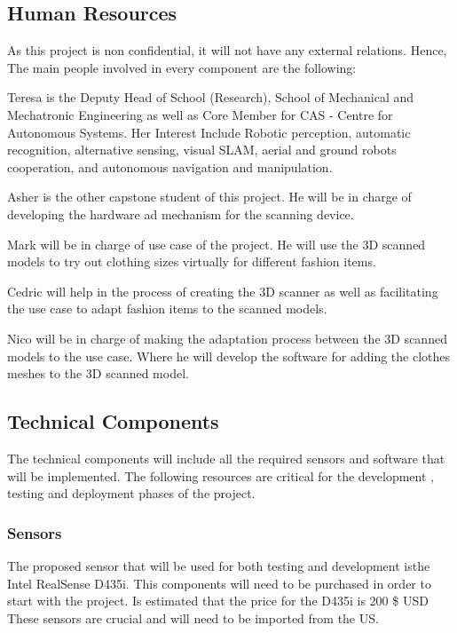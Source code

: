 \documentclass[12pt]{report}
\begin{document}
\subsection{Human Resources}
As this project is non confidential, it will not have any external relations. Hence, The main people involved in every component are the following:
\begin{description}[style=nextline]
  \item[Academic Supervisor – Dr. Teresa Vidal Calleja] Teresa is the Deputy Head of School (Research), School of Mechanical and Mechatronic Engineering as well as Core Member for CAS - Centre for Autonomous Systems. Her Interest Include Robotic perception, automatic recognition, alternative sensing, visual SLAM, aerial and ground robots cooperation, and autonomous navigation and manipulation.
  \item[Hardware Component lead – Asher Katz] Asher is the other capstone student of this project. He will be in charge of developing the hardware ad mechanism for the scanning device.
  \item[Use cases Component Lead – Mark Liu] Mark will be in charge of use case of the project. He will use the 3D scanned models to try out clothing sizes virtually for different fashion items.
  \item[Cedric Le Gentil] Cedric will help in the process of creating the 3D scanner as well as facilitating the use case to adapt fashion items to the scanned models.
  \item[Nico Pietroni] Nico will be in charge of making the adaptation process between the 3D scanned models to the use case. Where he will develop the software for adding the clothes meshes to the 3D scanned model.
\end{description}

\subsection{Technical Components }
The technical components will include all the required sensors and software that will be implemented. The following resources are critical for the development , testing and deployment phases of the project. 

\subsubsection{Sensors}
The proposed sensor that will be used for both testing and development isthe Intel RealSense D435i. This components will need to be purchased in order to start with the project. Is estimated that the price for the D435i is 200 \$ USD
These sensors are crucial and will need to be imported from the US. 
\end{document}
